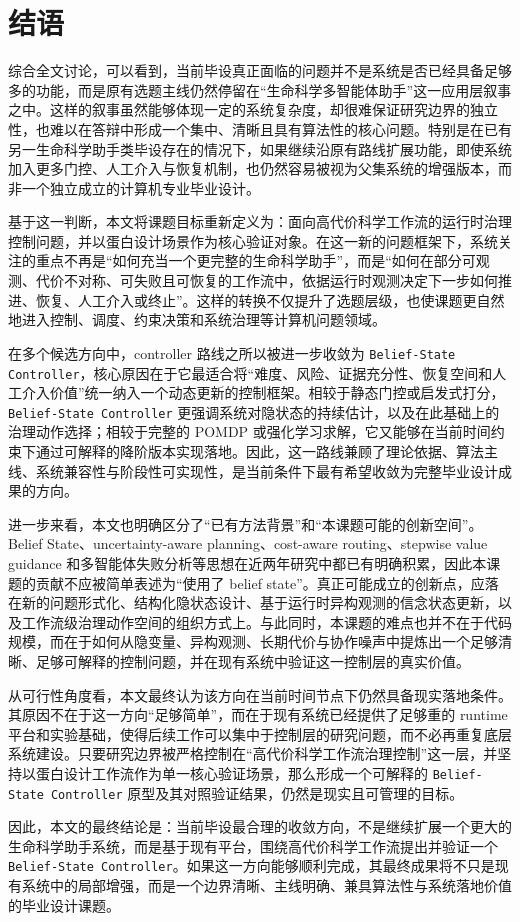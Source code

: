 \section{结语}

综合全文讨论，可以看到，当前毕设真正面临的问题并不是系统是否已经具备足够多的功能，而是原有选题主线仍然停留在“生命科学多智能体助手”这一应用层叙事之中。这样的叙事虽然能够体现一定的系统复杂度，却很难保证研究边界的独立性，也难以在答辩中形成一个集中、清晰且具有算法性的核心问题。特别是在已有另一生命科学助手类毕设存在的情况下，如果继续沿原有路线扩展功能，即使系统加入更多门控、人工介入与恢复机制，也仍然容易被视为父集系统的增强版本，而非一个独立成立的计算机专业毕业设计。

基于这一判断，本文将课题目标重新定义为：面向高代价科学工作流的运行时治理控制问题，并以蛋白设计场景作为核心验证对象。在这一新的问题框架下，系统关注的重点不再是“如何充当一个更完整的生命科学助手”，而是“如何在部分可观测、代价不对称、可失败且可恢复的工作流中，依据运行时观测决定下一步如何推进、恢复、人工介入或终止”。这样的转换不仅提升了选题层级，也使课题更自然地进入控制、调度、约束决策和系统治理等计算机问题领域。

在多个候选方向中，controller 路线之所以被进一步收敛为 \texttt{Belief-State Controller}，核心原因在于它最适合将“难度、风险、证据充分性、恢复空间和人工介入价值”统一纳入一个动态更新的控制框架。相较于静态门控或启发式打分，\texttt{Belief-State Controller} 更强调系统对隐状态的持续估计，以及在此基础上的治理动作选择；相较于完整的 POMDP 或强化学习求解，它又能够在当前时间约束下通过可解释的降阶版本实现落地。因此，这一路线兼顾了理论依据、算法主线、系统兼容性与阶段性可实现性，是当前条件下最有希望收敛为完整毕业设计成果的方向。

进一步来看，本文也明确区分了“已有方法背景”和“本课题可能的创新空间”。Belief State、uncertainty-aware planning、cost-aware routing、stepwise value guidance 和多智能体失败分析等思想在近两年研究中都已有明确积累，因此本课题的贡献不应被简单表述为“使用了 belief state”。真正可能成立的创新点，应落在新的问题形式化、结构化隐状态设计、基于运行时异构观测的信念状态更新，以及工作流级治理动作空间的组织方式上。与此同时，本课题的难点也并不在于代码规模，而在于如何从隐变量、异构观测、长期代价与协作噪声中提炼出一个足够清晰、足够可解释的控制问题，并在现有系统中验证这一控制层的真实价值。

从可行性角度看，本文最终认为该方向在当前时间节点下仍然具备现实落地条件。其原因不在于这一方向“足够简单”，而在于现有系统已经提供了足够重的 runtime 平台和实验基础，使得后续工作可以集中于控制层的研究问题，而不必再重复底层系统建设。只要研究边界被严格控制在“高代价科学工作流治理控制”这一层，并坚持以蛋白设计工作流作为单一核心验证场景，那么形成一个可解释的 \texttt{Belief-State Controller} 原型及其对照验证结果，仍然是现实且可管理的目标。

因此，本文的最终结论是：当前毕设最合理的收敛方向，不是继续扩展一个更大的生命科学助手系统，而是基于现有平台，围绕高代价科学工作流提出并验证一个 \texttt{Belief-State Controller}。如果这一方向能够顺利完成，其最终成果将不只是现有系统中的局部增强，而是一个边界清晰、主线明确、兼具算法性与系统落地价值的毕业设计课题。
